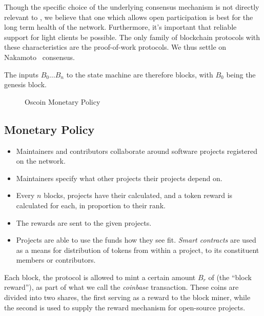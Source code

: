 Though the specific choice of the underlying consensus mechanism is not
directly relevant to \oscoin{}, we believe that one which allows open
participation is best for the long term health of the network. Furthermore,
it's important that reliable support for light clients be possible. The only
family of blockchain protocols with these characteristics are the proof-of-work
protocols. We thus settle on Nakamoto~\cite{bitcoin} consensus.

The inputs $B_0 \dotso B_n$ to the state machine are therefore blocks, with
$B_0$ being the genesis block.


\begin{figure*}[!ht]
    \par\medskip\noindent\minipage{\linewidth}
    \centering
    
    \caption{Oscoin Monetary Policy\label{f:oscoin}}
    \endminipage\par\medskip
\end{figure*}

\subsection{Monetary Policy}

\begin{itemize}
    \item Maintainers and contributors collaborate around software projects
        registered on the network.
    \item Maintainers specify what other projects their projects depend on.
    \item Every $n$ blocks, projects have their \osrank{} calculated, and a
        token reward is calculated for each, in proportion to their rank.
    \item The rewards are sent to the given projects.
    \item Projects are able to use the funds how they see fit. \emph{Smart
        contracts} are used as a means for distribution of tokens from within a
        project, to its constituent members or contributors.
\end{itemize}

Each block, the protocol is allowed to mint a certain amount $B_r$ of \oscoin{}
(the ``block reward''), as part of what we call the \emph{coinbase}
transaction. These coins are divided into two shares, the first serving as a
reward to the block miner, while the second is used to supply the reward
mechanism for open-source projects.

